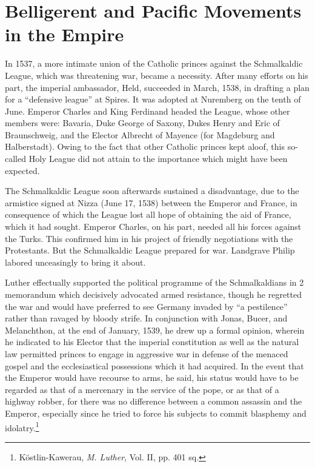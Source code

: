 \section{Belligerent and Pacific Movements in the Empire}

In 1537, a more intimate union of the Catholic princes against the
Schmalkaldic League, which was threatening war, became a necessity.
After many efforts on his part, the imperial ambassador, Held,
succeeded in March, 1538, in drafting a plan for a “defensive league”
at Spires. It was adopted at Nuremberg on the tenth of June. Emperor
Charles and King Ferdinand headed the League, whose other
members were: Bavaria, Duke George of Saxony, Dukes Henry and
Eric of Braunschweig, and the Elector Albrecht of Mayence (for
Magdeburg and Halberstadt). Owing to the fact that other Catholic
princes kept aloof, this so-called Holy League did not attain to the
importance which might have been expected.

The Schmalkaldic League soon afterwards sustained a disadvantage,
due to the armistice signed at Nizza (June 17, 1538) between the
Emperor and France, in consequence of which the League lost all
hope of obtaining the aid of France, which it had sought. Emperor
Charles, on his part, needed all his forces against the Turks. This confirmed
him in his project of friendly negotiations with the Protestants.
But the Schmalkaldic League prepared for war. Landgrave Philip
labored unceasingly to bring it about.

Luther effectually supported the political programme of the
Schmalkaldians in 2 memorandum which decisively advocated armed
resistance, though he regretted the war and would have preferred to
see Germany invaded by “a pestilence” rather than ravaged by bloody
strife. In conjunction with Jonas, Bucer, and Melanchthon, at the end
of January, 1539, he drew up a formal opinion, wherein he indicated
to his Elector that the imperial constitution as well as the natural
law permitted princes to engage in aggressive war in defense of the
menaced gospel and the ecclesiastical possessions which it had acquired.
In the event that the Emperor would have recourse to arms,
he said, his status would have to be regarded as that of a mercenary
in the service of the pope, or as that of a highway robber, for there
was no difference between a common assassin and the Emperor, especially
since he tried to force his subjects to commit blasphemy and
idolatry.\footnote{Köstlin-Kawerau, \textit{M. Luther}, Vol. II, pp. 401 sq.}


